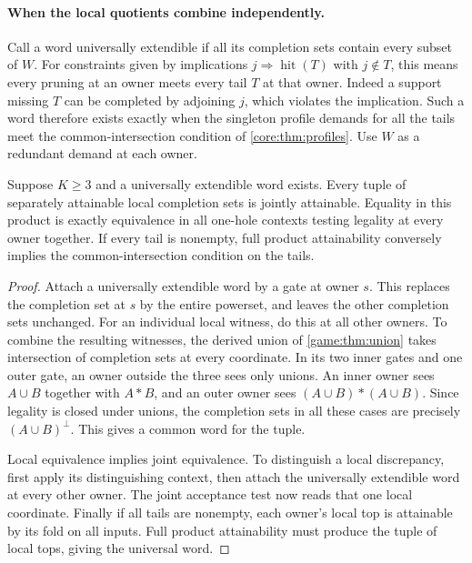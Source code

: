 \paragraph{When the local quotients combine independently.}
Call a word universally extendible if all its completion sets
contain every subset of $W$. For constraints given by implications
$j\Rightarrow\operatorname{hit}(T)$ with $j\notin T$, this means
every pruning at an owner meets every tail $T$ at that owner.
Indeed a support missing $T$ can be completed by adjoining $j$,
which violates the implication. Such a word therefore exists
exactly when the singleton profile demands for all the tails meet
the common-intersection condition of \cref{core:thm:profiles}.
Use $W$ as a redundant demand at each owner.

\begin{theorem}
\label{core:thm:pruning-context-product}
Suppose $K\ge3$ and a universally extendible word exists. Every
tuple of separately attainable local completion sets is jointly
attainable. Equality in this product is exactly equivalence in
all one-hole contexts testing legality at every owner together.
If every tail is nonempty, full product attainability conversely
implies the common-intersection condition on the tails.
\end{theorem}
\begin{proof}
Attach a universally extendible word by a gate at owner $s$.
This replaces the completion set at $s$ by the entire powerset,
and leaves the other completion sets unchanged. For an individual
local witness, do this at all other owners. To combine the resulting
witnesses, the derived union of \cref{game:thm:union} takes intersection
of completion sets at every coordinate. In its two inner gates
and one outer gate, an owner outside the three sees only unions.
An inner owner sees $A\cup B$ together with $A*B$, and an outer
owner sees $(A\cup B)*(A\cup B)$. Since legality is closed under
unions, the completion sets in all these cases are precisely
$(A\cup B)^\perp$. This gives a common word for the tuple.

Local equivalence implies joint equivalence. To distinguish a
local discrepancy, first apply its distinguishing context, then
attach the universally extendible word at every other owner.
The joint acceptance test now reads that one local coordinate.
Finally if all tails are nonempty, each owner's local top is
attainable by its fold on all inputs. Full product attainability
must produce the tuple of local tops, giving the universal word.
\end{proof}

